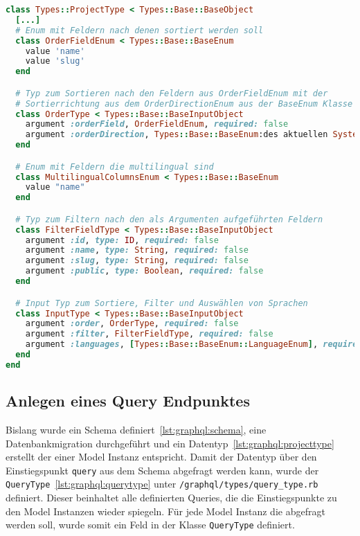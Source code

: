 \begin{lstlisting}[language=Ruby,float=h!,caption={Definition der Input Typen in \lstinline|/graphql/types/project_type.rb|}, label={lst:graphql:inputtype}]
class Types::ProjectType < Types::Base::BaseObject
  [...]
  # Enum mit Feldern nach denen sortiert werden soll 
  class OrderFieldEnum < Types::Base::BaseEnum
    value 'name'
    value 'slug'
  end

  # Typ zum Sortieren nach den Feldern aus OrderFieldEnum mit der
  # Sortierrichtung aus dem OrderDirectionEnum aus der BaseEnum Klasse
  class OrderType < Types::Base::BaseInputObject
    argument :orderField, OrderFieldEnum, required: false
    argument :orderDirection, Types::Base::BaseEnum:des aktuellen Systems mit GraphQL:OrderDirectionEnum, required: false
  end

  # Enum mit Feldern die multilingual sind
  class MultilingualColumnsEnum < Types::Base::BaseEnum
    value "name"
  end

  # Typ zum Filtern nach den als Argumenten aufgeführten Feldern
  class FilterFieldType < Types::Base::BaseInputObject
    argument :id, type: ID, required: false
    argument :name, type: String, required: false
    argument :slug, type: String, required: false
    argument :public, type: Boolean, required: false
  end

  # Input Typ zum Sortiere, Filter und Auswählen von Sprachen
  class InputType < Types::Base::BaseInputObject
    argument :order, OrderType, required: false
    argument :filter, FilterFieldType, required: false
    argument :languages, [Types::Base::BaseEnum::LanguageEnum], required: false
  end
end
\end{lstlisting}


\subsection{Anlegen eines Query Endpunktes}
\label{impl:graphql:querytype}
\label{graphql:querytypes}
Bislang wurde ein Schema definiert~\ref{lst:graphql:schema}, eine Datenbankmigration durchgeführt und ein Datentyp~\ref{lst:graphql:projecttype} erstellt der einer Model Instanz entspricht. Damit der Datentyp über den Einstiegspunkt \lstinline|query| aus dem Schema abgefragt werden kann, wurde der \lstinline|QueryType|~\ref{lst:graphql:querytype} unter \lstinline|/graphql/types/query_type.rb| definiert.
Dieser beinhaltet alle definierten Queries, die die Einstiegspunkte zu den Model Instanzen wieder spiegeln. Für jede Model Instanz die abgefragt werden soll, wurde somit ein Feld in der Klasse \lstinline|QueryType| definiert.

